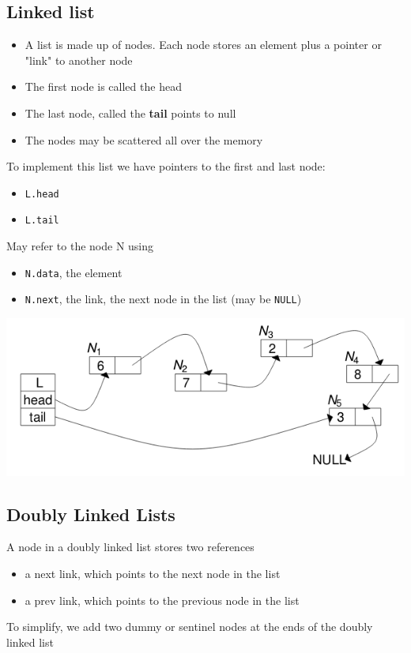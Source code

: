 \documentclass{article}[18pt]
\begin{document}
\subsection{Linked list}
\begin{itemize}
	\item A list is made up of nodes. Each node stores an element plus a pointer or "link" to another node
	\item The first node is called the head
	\item The last node, called the \textbf{tail} points to null
	\item The nodes may be scattered all over the memory
\end{itemize}
To implement this list we have pointers to the first and last node:
\begin{itemize}
	\item \texttt{L.head}
	\item \texttt{L.tail}
\end{itemize}
May refer to the node N using
\begin{itemize}
	\item \texttt{N.data}, the element
	\item \texttt{N.next}, the link, the next node in the list (may be \texttt{NULL})
\end{itemize}
\begin{center}
	\includegraphics[scale=0.7]{"Linked List"}
\end{center}
\subsection{Doubly Linked Lists}
A node in a doubly linked list stores two references
\begin{itemize}
	\item a next link, which points to the next node in the list
	\item a prev link, which points to the previous node in the list
\end{itemize}
To simplify, we add two dummy or sentinel nodes at the ends of the doubly linked list
\end{document}
